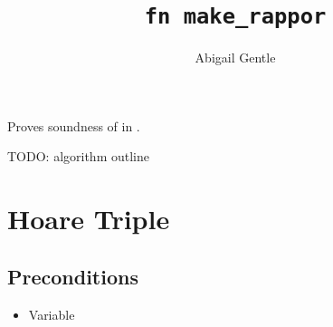 \documentclass{article}
\title{\texttt{fn make\_rappor}}
\author{Abigail Gentle}
\begin{document}
\maketitle



\contrib

Proves soundness of  in .

TODO: algorithm outline
\section{Hoare Triple}
\subsection{Preconditions}
\begin{itemize}
	\item Variable 
\end{itemize}
\end{document}
